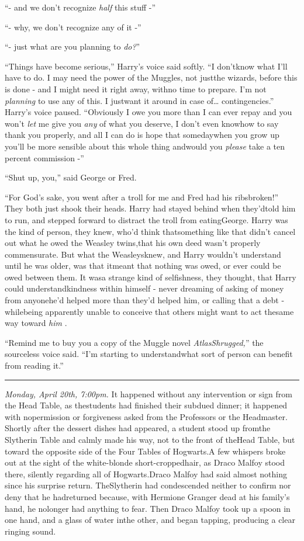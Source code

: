 ``- and we don't recognize \emph{half} this stuff -''

``- why, we don't recognize any of it -''

``- just what are you planning to \emph{do?}''

``Things have become serious,'' Harry's voice said softly. ``I don'tknow what I'll have to do. I may need the power of the Muggles, not justthe wizards, before this is done - and I might need it right away, withno time to prepare. I'm not \emph{planning} to use any of this. I justwant it around in case of\ldots{} contingencies.'' Harry's voice paused.
``Obviously I owe you more than I can ever repay and you won't
\emph{let} me give you \emph{any} of what you deserve, I don't even knowhow to say thank you properly, and all I can do is hope that somedaywhen you grow up you'll be more sensible about this whole thing andwould you \emph{please} take a ten percent commission -''

``Shut up, you,'' said George or Fred.

``For God's sake, you went after a troll for me and Fred had his ribsbroken!''
They both just shook their heads. Harry had stayed behind when they'dtold him to run, and stepped forward to distract the troll from eatingGeorge. Harry was the kind of person, they knew, who'd think thatsomething like that didn't cancel out what he owed the Weasley twins,that his own deed wasn't properly commensurate. But what the Weasleysknew, and Harry wouldn't understand until he was older, was that itmeant that nothing was owed, or ever could be owed between them. It wasa strange kind of selfishness, they thought, that Harry could understandkindness within himself - never dreaming of asking of money from anyonehe'd helped more than they'd helped him, or calling that a debt - whilebeing apparently unable to conceive that others might want to act thesame way toward \emph{him} .

``Remind me to buy you a copy of the Muggle novel \emph{AtlasShrugged,}'' the sourceless voice said. ``I'm starting to understandwhat sort of person can benefit from reading it.''

\begin{center}\rule{3in}{0.4pt}\end{center}

\emph{Monday, April 20th, 7:00pm.}
It happened without any intervention or sign from the Head Table, as thestudents had finished their subdued dinner; it happened with nopermission or forgiveness asked from the Professors or the Headmaster.
Shortly after the dessert dishes had appeared, a student stood up fromthe Slytherin Table and calmly made his way, not to the front of theHead Table, but toward the opposite side of the Four Tables of Hogwarts.A few whispers broke out at the sight of the white-blonde short-croppedhair, as Draco Malfoy stood there, silently regarding all of Hogwarts.Draco Malfoy had said almost nothing since his surprise return. TheSlytherin had condescended neither to confirm nor deny that he hadreturned because, with Hermione Granger dead at his family's hand, he nolonger had anything to fear.
Then Draco Malfoy took up a spoon in one hand, and a glass of water inthe other, and began tapping, producing a clear ringing sound.

